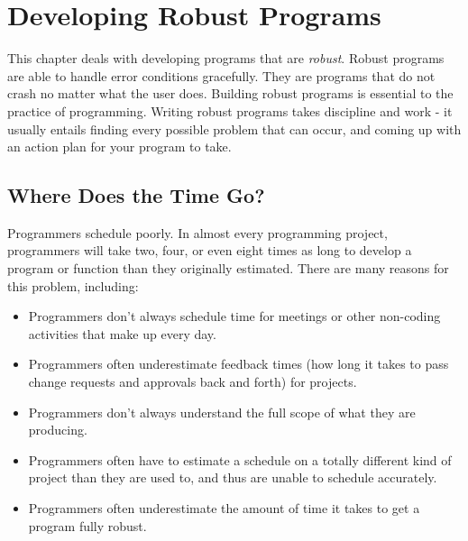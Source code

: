 \chapter{Developing Robust Programs}
\label{developingrobustprograms}

% 
% 
% 
% 

This chapter deals with developing programs that are 
\emph{robust}.  Robust
programs are able to handle error conditions gracefully.  They
are programs that do not crash no matter what the user does.  Building
robust programs is essential to the practice of programming.  Writing 
robust programs takes discipline and work - it usually entails finding every
possible problem that can occur, and coming up with an action plan for
your program to take.

\section{Where Does the Time Go?}

Programmers schedule poorly.  In almost every programming project, 
programmers will take two, four, or even eight times as long to develop
a program or function than they originally estimated.  There are many
reasons for this problem, including:

\begin{itemize}\item Programmers don't always schedule time for meetings or other non-coding activities that make up every day. 
\item Programmers often underestimate feedback times (how long it takes to pass change requests and approvals back and forth) for projects. 
\item Programmers don't always understand the full scope of what they are producing. 
\item Programmers often have to estimate a schedule on a totally different kind of project than they are used to, and thus are unable to schedule accurately. 
\item Programmers often underestimate the amount of time it takes to get a program fully robust. 
\end{itemize}

